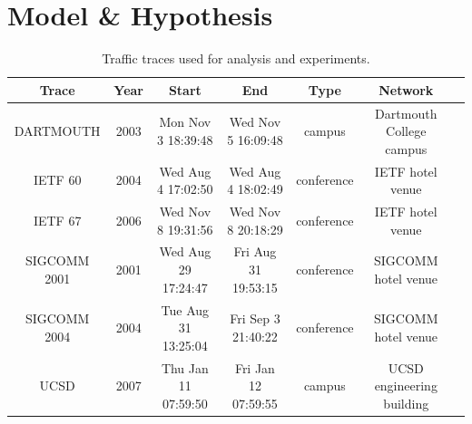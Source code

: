 \documentclass{acm_proc_article-sp}
\begin{document}
\section{Model \& Hypothesis}

\begin{table}
\begin{center}
\small
\begin{tabular}{|c|c|c|c|c|c|c|}

\hline
\textbf{Trace} &
\textbf{Year} &
\textbf{Start} &
\textbf{End} &
\textbf{Type} &
\textbf{Network} \\
\hline

{\footnotesize{DARTMOUTH}} &
2003 &
Mon Nov  3 18:39:48 &
Wed Nov  5 16:09:48 &
campus &
Dartmouth College campus \\
\hline

{\footnotesize{IETF 60}} &
2004 &
Wed Aug  4 17:02:50 &
Wed Aug  4 18:02:49 &
conference &
IETF hotel venue \\
\hline

{\footnotesize{IETF 67}} &
2006 &
Wed Nov  8 19:31:56 &
Wed Nov  8 20:18:29 &
conference &
IETF hotel venue \\
\hline

{\footnotesize{SIGCOMM 2001}} &
2001 &
Wed Aug 29 17:24:47 &
Fri Aug 31 19:53:15 &
conference &
SIGCOMM hotel venue \\
\hline

{\footnotesize{SIGCOMM 2004}} &
2004 &
Tue Aug 31 13:25:04 &
Fri Sep  3 21:40:22 &
conference &
SIGCOMM hotel venue \\
\hline

{\footnotesize{UCSD}} &
2007 &
Thu Jan 11 07:59:50 &
Fri Jan 12 07:59:55 &
campus &
UCSD engineering building \\
\hline

\end{tabular}
\caption{Traffic traces used for analysis and experiments.}
\end{center}
\vspace{-2.5em}
\end{table}
\end{document}
